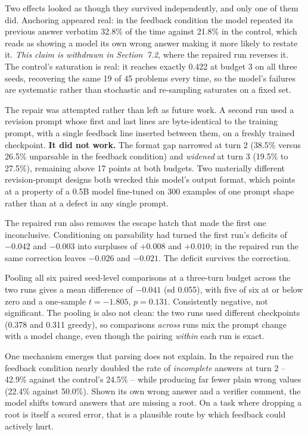 \documentclass[11pt]{article}
\begin{document}
Two effects looked as though they survived independently, and only one of
them did. Anchoring appeared real: in the feedback condition the model
repeated its previous answer verbatim 32.8\% of the time against 21.8\% in
the control, which reads as showing a model its own wrong answer making it
more likely to restate it. \emph{This claim is withdrawn in
Section~7.2}, where the repaired run reverses it. The control's saturation is
real: it reaches exactly 0.422 at budget 3 on all three seeds, recovering
the same 19 of 45 problems every time, so the model's failures are
systematic rather than stochastic and re-sampling saturates on a fixed set.

The repair was attempted rather than left as future work. A second run used
a revision prompt whose first and last lines are byte-identical to the
training prompt, with a single feedback line inserted between them, on a
freshly trained checkpoint. \textbf{It did not work.} The format gap
narrowed at turn 2 (38.5\% versus 26.5\% unparsable in the feedback
condition) and \emph{widened} at turn 3 (19.5\% to 27.5\%), remaining above
17 points at both budgets. Two materially different revision-prompt designs
both wrecked this model's output format, which points at a property of a
0.5B model fine-tuned on 300 examples of one prompt shape rather than at a
defect in any single prompt.

The repaired run also removes the escape hatch that made the first one
inconclusive. Conditioning on parsability had turned the first run's
deficits of $-0.042$ and $-0.003$ into surpluses of $+0.008$ and $+0.010$;
in the repaired run the same correction leaves $-0.026$ and $-0.021$. The
deficit survives the correction.

Pooling all six paired seed-level comparisons at a three-turn budget across
the two runs gives a mean difference of $-0.041$ (sd 0.055), with five of
six at or below zero and a one-sample $t=-1.805$, $p=0.131$. Consistently
negative, not significant. The pooling is also not clean: the two runs used
different checkpoints (0.378 and 0.311 greedy), so comparisons \emph{across}
runs mix the prompt change with a model change, even though the pairing
\emph{within} each run is exact.

One mechanism emerges that parsing does not explain. In the repaired run the
feedback condition nearly doubled the rate of \emph{incomplete} answers at
turn 2 -- 42.9\% against the control's 24.5\% -- while producing far fewer
plain wrong values (22.4\% against 50.0\%). Shown its own wrong answer and a
verifier comment, the model shifts toward answers that are missing a root.
On a task where dropping a root is itself a scored error, that is a
plausible route by which feedback could actively hurt.
\end{document}
